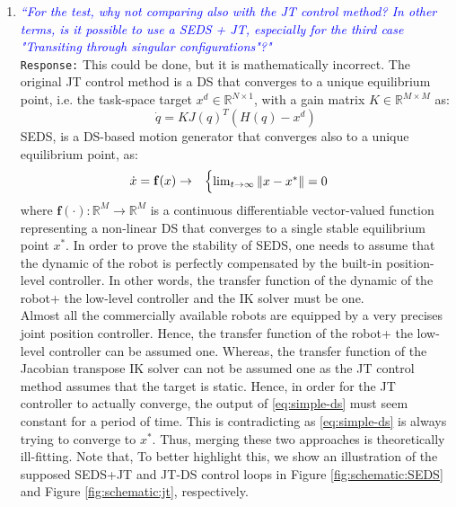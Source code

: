 \documentclass{article}
\begin{document}
\begin{enumerate}
\item \textcolor{blue}{\textit{``For the test, why not comparing also with the JT control method? In
other terms, is it possible to use a SEDS + JT, especially for the
third case "Transiting through singular configurations"?"}}\\
\texttt{Response:} \small This could be done, but it is mathematically incorrect. The original JT control method is a DS that converges to a unique equilibrium point, i.e. the task-space target $x^d\in \mathbb{R}^{N\times 1}$, with a gain matrix $K \in \mathbb{R}^{M\times M}$ as:\begin{equation}
\dot{q} = K J(q)^T(H(q)- x^d) 
\label{eq:JT}
\end{equation}
SEDS, is a DS-based motion generator that converges also to a unique equilibrium point, as:
\begin{equation}
\hfill \begin{aligned}
&  \dot{x}  = \mathbf{f}(x)
\rightarrow  &
\begin{cases}
\lim_{t \rightarrow \infty}\|x - x^*\|=0
\end{cases}
\end{aligned}  \hfill
\label{eq:simple-ds}
\end{equation}
where $\mathbf{f}(\cdot): \mathbb{R}^M \rightarrow \mathbb{R}^M$ is a continuous differentiable vector-valued function representing a non-linear DS that converges to a single stable equilibrium point $x^*$. In order to prove the stability of SEDS, one needs to assume that the dynamic of the robot is perfectly compensated by the built-in position-level controller. In other words, the transfer function of the dynamic of the robot+ the low-level controller and the IK solver must be one. \\
Almost all the commercially available robots are equipped by a very precises joint position controller. Hence, the transfer function of the robot+ the low-level controller can be assumed one. Whereas, the transfer function of the Jacobian transpose IK solver can not be assumed one as the JT control method assumes that the target is static. Hence, in order for the JT controller to actually converge, the output of \eqref{eq:simple-ds} must seem constant for a period of time. This is contradicting as \eqref{eq:simple-ds} is always trying to converge to $x^*$. Thus, merging these two approaches is theoretically ill-fitting. Note that,  To better highlight this, we show an illustration of the supposed SEDS+JT and JT-DS control loops in Figure \ref{fig:schematic:SEDS} and  Figure \ref{fig:schematic:jt}, respectively.\\




\end{enumerate}
\end{document}
